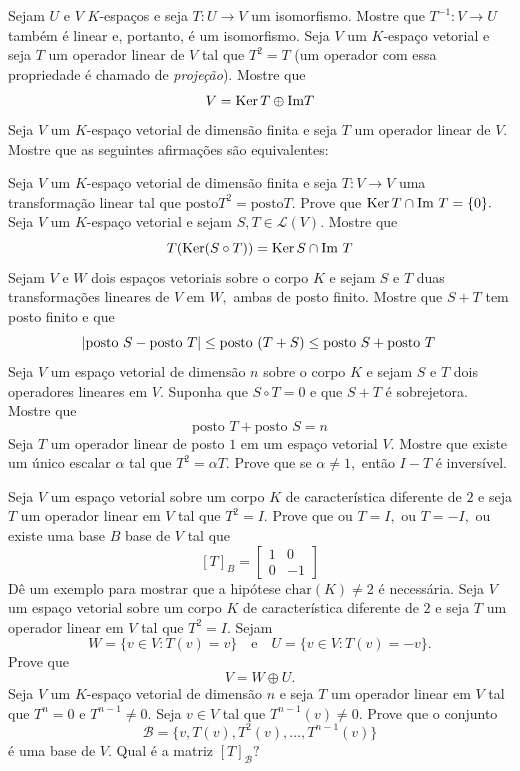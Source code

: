 \documentclass[11pt,a4paper]{article}
\begin{document}
\solucao{}
 Sejam $U$ e $V$ $K$-espaços e seja $T \colon U \to V$ um isomorfismo. Mostre que $T^{-1} \colon V \to U$ também é linear e, portanto, é um isomorfismo.
\solucao{}
 Seja $V$ um $K$-espaço vetorial e seja $T$ um operador linear de $V$ tal que $T^2 = T$ (um operador
com essa propriedade é chamado de \emph{projeção}). Mostre que \[V = \operatorname{Ker} T \oplus \mbox{Im} T\]
\solucao{}
 Seja $V$ um $K$-espaço vetorial de dimensão finita e seja $T$ um operador linear de $V.$ Mostre que as seguintes afirmações são equivalentes:

\solucao{%
}
 Seja $V$ um $K$-espaço vetorial de dimensão finita e seja $T \colon V \to V$ uma transformação linear tal que $\mbox{posto} T^2 = \mbox{posto} T.$ Prove que $\operatorname{Ker} T \cap \mbox{Im } T = \{0\}.$
\solucao{}
 Seja $V$ um $K$-espaço vetorial e sejam $S, T \in \mathcal{L}(V).$ Mostre que
\[
T(\operatorname{Ker}(S \circ T)) = \operatorname{Ker} S \cap \mbox{Im } T
\]
\solucao{}
 Sejam $V$ e $W$ dois espaços vetoriais sobre o corpo $K$ e sejam $S$ e $T$ duas transformações lineares de $V$ em $W,$ ambas de posto finito. Mostre que $S + T$ tem posto finito e que
\[
\abs{\mbox{posto } S - \mbox{posto } T} \le \mbox{posto }(T + S) \le \mbox{posto } S + \mbox{posto } T
\]
\solucao{}
 Seja $V$ um espaço vetorial de dimensão $n$ sobre o corpo $K$ e sejam $S$ e $T$ dois operadores
lineares em $V$. Suponha que $S \circ T = 0$ e que $S + T$ é sobrejetora. Mostre que 
\[
\mbox{posto } T + \mbox{posto } S = n
\]
\solucao{}
 Seja $T$ um operador linear de posto $1$ em um espaço vetorial $V.$ Mostre que existe um único
escalar $\alpha$ tal que $T^2 = \alpha T.$ Prove que se $\alpha \neq 1,$ então $I- T$ é inversível.

\solucao{}
  Seja $V$ um espaço vetorial sobre um corpo $K$ de característica diferente de $2$ e seja $T$ um
operador linear em $V$ tal que $T^2 = I.$ Prove que ou $T = I,$ ou $T = -I,$ ou existe uma base $B$ base de $V$ tal que
\[
[T]_{B} = \begin{bmatrix}
1 & 0 \\
0 & -1
\end{bmatrix}
\]
Dê um exemplo para mostrar que a hipótese $\mbox{char}(K) \neq 2$ é necessária.
\solucao{}
 Seja $V$ um espaço vetorial sobre um corpo $K$ de característica diferente de $2$ e seja $T$ um
operador linear em $V$ tal que $T^2 = I.$ Sejam 
\[W = \{v \in V : T(v) = v\} \quad \mbox{e} \quad U = \{v \in V : T(v) = -v\}.\] Prove que 
\[V = W \oplus U.\] 
\solucao{}
 Seja $V$ um $K$-espaço vetorial de dimensão $n$ e seja $T$ um operador linear em $V$ tal que $T^n = 0$ e $T^{n-1} \neq 0$. Seja $v \in V$ tal que $T^{n-1}(v) \neq 0.$ Prove que o conjunto
\[\mathcal{B} = \{v, T(v), T^2(v), \ldots, T^{n-1}(v) \}\]
é uma base de $V$. Qual é a matriz $[T]_{\mathcal{B}}?$ 
\end{document}
